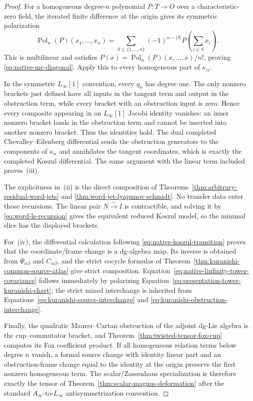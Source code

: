 \documentclass[11pt]{article}
\theoremstyle{definition}
\begin{document}
\begin{proof}
For a homogeneous degree-$n$ polynomial $P:T\to O$ over a characteristic-zero
field, the iterated finite difference at the origin gives its symmetric
polarization
\[
 \operatorname{Pol}_n(P)(x_1,\ldots,x_n)
 =\sum_{S\subseteq\{1,\ldots,n\}}
 (-1)^{n-|S|}P\!\left(\sum_{i\in S}x_i\right).
\]
This is multilinear and satisfies
$P(x)=\operatorname{Pol}_n(P)(x,\ldots,x)/n!$, proving
\eqref{eq:native-mc-diagonal}.  Apply this to every homogeneous part of
$\kappa_\alpha$.

In the symmetric $L_\infty[1]$ convention, every $q_n$ has degree one.  The
only nonzero brackets just defined have all inputs in the tangent term and
output in the obstruction term, while every bracket with an obstruction input
is zero.  Hence every composite appearing in an $L_\infty[1]$ Jacobi identity
vanishes: an inner nonzero bracket lands in the obstruction term and cannot be
inserted into another nonzero bracket.  Thus the identities hold.  The dual
completed Chevalley--Eilenberg differential sends the obstruction generators
to the components of $\kappa_\alpha$ and annihilates the tangent coordinates,
which is exactly the completed Koszul differential.  The same argument with
the linear term included proves~(iii).

The explicitness in~(ii) is the direct composition of
Theorems~\ref{thm:arbitrary-residual-word-jets} and
\ref{thm:word-jet-lyapunov-schmidt}.  No transfer data enter those recursions.
The linear pair $N\xrightarrow{\sim}I$ is contractible, and solving it by
\eqref{eq:word-ls-recursion} gives the equivalent reduced Koszul model, so the
minimal slice has the displayed brackets.

For~(iv), the differential calculation following
\eqref{eq:native-koszul-transition} proves that the coordinate/frame change is
a dg-algebra map.  Its inverse is obtained from
$\Psi_{\alpha\beta}$ and $C_{\alpha\beta}$, and the strict cocycle formulas of
Theorem~\ref{thm:kuranishi-common-source-atlas} give strict composition.
Equation~\eqref{eq:native-linfinity-tower-covariance} follows immediately by
polarizing Equation~\eqref{eq:presentation-tower-kuranishi-chart}; the strict
mixed interchange is inherited from
Equations~\eqref{eq:kuranishi-source-interchange} and
\eqref{eq:kuranishi-obstruction-interchange}.

Finally, the quadratic Maurer--Cartan obstruction of the adjoint dg-Lie
algebra is the cup--commutator bracket, and
Theorem~\ref{thm:twisted-tensor-fox-cup} computes its Fox coefficient product.
If all homogeneous relation terms below degree $n$ vanish, a formal source
change with identity linear part and an obstruction-frame change equal to the
identity at the origin preserve the first nonzero homogeneous term.  The
scalar/Zassenhaus specialization is therefore exactly the tensor of
Theorem~\ref{thm:scalar-magnus-deformation} after the standard
$A_\infty$-to-$L_\infty$ antisymmetrization convention.
\end{proof}
\end{document}
